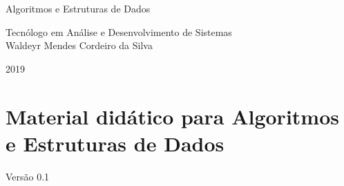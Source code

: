 \documentclass[11pt,fleqn]{book} %
\begin{document}
\let\cleardoublepage\clearpage

\renewcommand{\chaptername}{Capítulo}
\renewcommand{\figurename}{Fig.}

\begingroup
	\thispagestyle{empty}
	
	
	
	
	\vspace*{4.5cm}
	
	\centering
	\par
	\fontsize{30}{30}
	\selectfont
	Algoritmos e Estruturas de Dados \\
	\vspace*{1.5cm}
	\par
	\fontsize{16}{16}
	\selectfont
	Tecnólogo em Análise e Desenvolvimento de Sistemas\\
	\vspace*{1.5cm}
	Waldeyr Mendes Cordeiro da Silva\\
	\vspace*{10cm}
	\par
	{\Huge 2019}
	\par
\endgroup
\pagebreak

\par
\section*{Material didático para Algoritmos e Estruturas de Dados}

Versão 0.1
\end{document}
